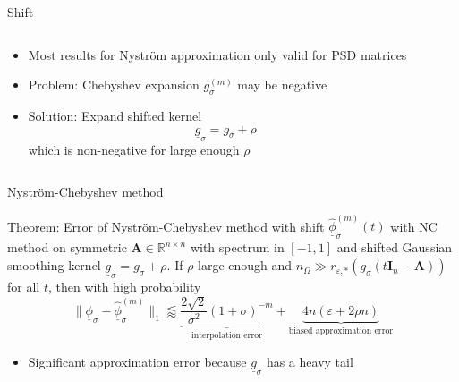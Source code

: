 \documentclass[aspectratio=169, leqno, 12pt]{beamer}
\newcommand{\mtx}[1]{\boldsymbol{#1}}
\begin{document}
\begin{frame}{Shift}
    \begin{columns}
        \begin{column}{0.55\textwidth}
            \begin{itemize}
                \item Most results for Nystr\"om approximation only valid for PSD matrices
                \item Problem: Chebyshev expansion $g_{\sigma}^{(m)}$ may be negative
                \item Solution: Expand shifted kernel
                    \begin{equation}
                        \underline{g}_{\sigma} = g_{\sigma} + \rho
                    \end{equation}
                    which is non-negative for large enough $\rho$
            \end{itemize}
        \end{column}
        \begin{column}{0.45\textwidth}
            \scalebox{0.65}{}
        \end{column}
    \end{columns}   
\end{frame}

\begin{frame}{Nystr\"om-Chebyshev method}
    \begin{block}{Theorem: Error of Nystr\"om-Chebyshev method with shift}
        $\underline{\widehat{\phi}}_{\sigma}^{(m)}(t)$ with \gls{NC} method
        on symmetric $\mtx{A} \in \mathbb{R}^{n \times n}$ with spectrum in $[-1, 1]$
        and shifted Gaussian smoothing kernel $\underline{g}_{\sigma}=g_{\sigma} + \rho$.
        If $\rho$ large enough and $n_{\Omega} \gg r_{\varepsilon, \ast}(g_{\sigma}(t\mtx{I}_n - \mtx{A}))$
        for all $t$, then with high probability
        \begin{equation}
            \lVert \underline{\phi}_{\sigma} - \widehat{\underline{\phi}}_{\sigma}^{(m)} \rVert _1
            \lessapprox \underbrace{\frac{2\sqrt{2}}{\sigma^2} (1 + \sigma)^{-m}}_{\text{interpolation error}}
             + \underbrace{4 n (\varepsilon + 2 \rho n)}_{\text{biased approximation error}}
        \end{equation}
    \end{block}
    \begin{itemize}
        \item Significant approximation error because $\underline{g}_{\sigma}$ has a heavy tail
    \end{itemize}
\end{frame}
\end{document}
